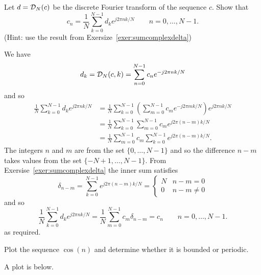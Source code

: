 \begin{excersizelist}
\item \label{exer:inversedft} Let $d = {\mathcal D}_N(c)$ be the discrete Fourier transform of the sequence $c$.  Show that
\[
c_n = \frac{1}{N}\sum_{k = 0}^{N-1} d_k e^{j 2\pi n k / N} \qquad n = 0, \dots, N-1.
\]
(Hint: use the result from Exersize~\ref{exer:sumcomplexdelta})
\begin{solution}
We have
\[
d_k = {\mathcal D}_N(c,k) = \sum_{n = 0}^{N-1} c_n e^{-j 2\pi n k / N}
\]
and so
\begin{align*}
\frac{1}{N}\sum_{k = 0}^{N-1} d_k e^{j 2\pi n k / N} &= \frac{1}{N}\sum_{k = 0}^{N-1} \left( \sum_{m = 0}^{N-1} c_m e^{-j 2\pi m k / N} \right) e^{j 2\pi n k / N} \\
&= \frac{1}{N}\sum_{k = 0}^{N-1} \sum_{m = 0}^{N-1} c_m e^{j 2\pi (n-m) k / N} \\
&=  \frac{1}{N} \sum_{m = 0}^{N-1} c_m \sum_{k = 0}^{N-1} e^{j 2\pi (n-m) k / N}.
\end{align*}
The integers $n$ and $m$ are from the set $\{0,\dots,N-1\}$ and so the difference $n-m$ takes values from the set $\{-N+1,\dots,N-1\}$.  From Exersise~\ref{exer:sumcomplexdelta} the inner sum satisfies
\[
\delta_{n-m} = \sum_{k = 0}^{N-1} e^{j 2\pi (n-m) k / N} = \begin{cases}
N & n - m = 0 \\
0 & n-m \neq 0
\end{cases}
\]
and so
\[
\frac{1}{N}\sum_{k = 0}^{N-1} d_k e^{j 2\pi n k / N} = \frac{1}{N} \sum_{m = 0}^{N-1} c_m \delta_{n-m} = c_n \qquad n = 0, \dots, N-1.
\]
as required.

\end{solution}

\item Plot the sequence $\cos(n)$ and determine whether it is bounded or periodic.
\begin{solution}
A plot is below.  

\begin{center}
{
\def\minn{-15}
\def\maxn{15}
\def\scalex{0.3}
\def\step(#1){(#1>=0)} %
}
\end{center}


\end{solution}
\end{excersizelist}
